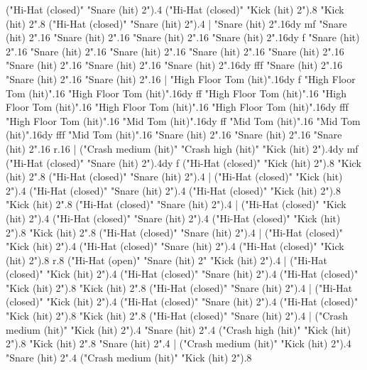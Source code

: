       ("Hi-Hat (closed)" "Snare (hit) 2").4
      ("Hi-Hat (closed)" "Kick (hit) 2").8
      "Kick (hit) 2".8
      ("Hi-Hat (closed)" "Snare (hit) 2").4
    |
      "Snare (hit) 2".16{dy mf}
      "Snare (hit) 2".16
      "Snare (hit) 2".16
      "Snare (hit) 2".16
      "Snare (hit) 2".16{dy f}
      "Snare (hit) 2".16
      "Snare (hit) 2".16
      "Snare (hit) 2".16
      "Snare (hit) 2".16
      "Snare (hit) 2".16
      "Snare (hit) 2".16
      "Snare (hit) 2".16
      "Snare (hit) 2".16{dy fff}
      "Snare (hit) 2".16
      "Snare (hit) 2".16
      "Snare (hit) 2".16
    |
      "High Floor Tom (hit)".16{dy f}
      "High Floor Tom (hit)".16
      "High Floor Tom (hit)".16{dy ff}
      "High Floor Tom (hit)".16
      "High Floor Tom (hit)".16
      "High Floor Tom (hit)".16
      "High Floor Tom (hit)".16{dy fff}
      "High Floor Tom (hit)".16
      "Mid Tom (hit)".16{dy ff}
      "Mid Tom (hit)".16
      "Mid Tom (hit)".16{dy fff}
      "Mid Tom (hit)".16
      "Snare (hit) 2".16
      "Snare (hit) 2".16
      "Snare (hit) 2".16
      r.16
    |
      ("Crash medium (hit)" "Crash high (hit)" "Kick (hit) 2").4{dy mf}
      ("Hi-Hat (closed)" "Snare (hit) 2").4{dy f}
      ("Hi-Hat (closed)" "Kick (hit) 2").8
      "Kick (hit) 2".8
      ("Hi-Hat (closed)" "Snare (hit) 2").4
    |
      ("Hi-Hat (closed)" "Kick (hit) 2").4
      ("Hi-Hat (closed)" "Snare (hit) 2").4
      ("Hi-Hat (closed)" "Kick (hit) 2").8
      "Kick (hit) 2".8
      ("Hi-Hat (closed)" "Snare (hit) 2").4
    |
      ("Hi-Hat (closed)" "Kick (hit) 2").4
      ("Hi-Hat (closed)" "Snare (hit) 2").4
      ("Hi-Hat (closed)" "Kick (hit) 2").8
      "Kick (hit) 2".8
      ("Hi-Hat (closed)" "Snare (hit) 2").4
    |
      ("Hi-Hat (closed)" "Kick (hit) 2").4
      ("Hi-Hat (closed)" "Snare (hit) 2").4
      ("Hi-Hat (closed)" "Kick (hit) 2").8
      r.8
      ("Hi-Hat (open)" "Snare (hit) 2" "Kick (hit) 2").4
    |
      ("Hi-Hat (closed)" "Kick (hit) 2").4
      ("Hi-Hat (closed)" "Snare (hit) 2").4
      ("Hi-Hat (closed)" "Kick (hit) 2").8
      "Kick (hit) 2".8
      ("Hi-Hat (closed)" "Snare (hit) 2").4
    |
      ("Hi-Hat (closed)" "Kick (hit) 2").4
      ("Hi-Hat (closed)" "Snare (hit) 2").4
      ("Hi-Hat (closed)" "Kick (hit) 2").8
      "Kick (hit) 2".8
      ("Hi-Hat (closed)" "Snare (hit) 2").4
    |
      ("Crash medium (hit)" "Kick (hit) 2").4
      "Snare (hit) 2".4
      ("Crash high (hit)" "Kick (hit) 2").8
      "Kick (hit) 2".8
      "Snare (hit) 2".4
    |
      ("Crash medium (hit)" "Kick (hit) 2").4
      "Snare (hit) 2".4
      ("Crash medium (hit)" "Kick (hit) 2").8

